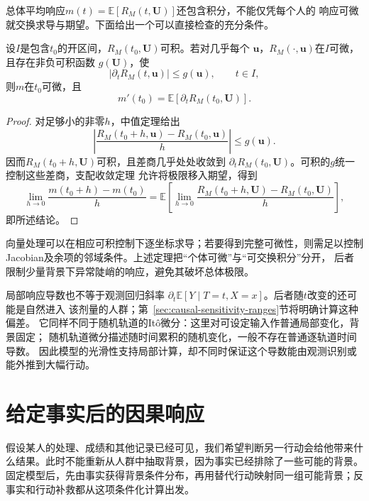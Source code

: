 总体平均响应\(m(t)=\mathbb E[R_M(t,\bm U)]\)还包含积分，不能仅凭每个人的
响应可微就交换求导与期望。下面给出一个可以直接检查的充分条件。
\begin{theorem}[平均响应的求导]
  \label{thm:causal-response-differentiation}
  设\(I\)是包含\(t_0\)的开区间，\(R_M(t_0,\bm U)\)可积。若对几乎每个
  \(\bm u\)，\(R_M(\cdot,\bm u)\)在\(I\)可微，且存在非负可积函数
  \(g(\bm U)\)，使
  \[
    |\partial_tR_M(t,\bm u)|\leq g(\bm u),
    \qquad t\in I,
  \]
  则\(m\)在\(t_0\)可微，且
  \begin{equation}
    m'(t_0)=\mathbb E[\partial_tR_M(t_0,\bm U)].
    \label{eq:causal-average-response-derivative}
  \end{equation}
\end{theorem}
\begin{proof}
  对足够小的非零\(h\)，中值定理给出
  \[
    \left|
      \frac{R_M(t_0+h,\bm u)-R_M(t_0,\bm u)}{h}
    \right|\leq g(\bm u).
  \]
  因而\(R_M(t_0+h,\bm U)\)可积，且差商几乎处处收敛到
  \(\partial_tR_M(t_0,\bm U)\)。可积的\(g\)统一控制这些差商，支配收敛定理
  允许将极限移入期望，得到
  \[
    \lim_{h\to0}\frac{m(t_0+h)-m(t_0)}{h}
    =
    \mathbb E\!\left[
      \lim_{h\to0}
      \frac{R_M(t_0+h,\bm U)-R_M(t_0,\bm U)}{h}
    \right],
  \]
  即所述结论。
\end{proof}

向量处理可以在相应可积控制下逐坐标求导；若要得到完整可微性，则需足以控制
Jacobian及余项的邻域条件。上述定理把“个体可微”与“可交换积分”分开，
后者限制少量背景下异常陡峭的响应，避免其破坏总体极限。

局部响应导数也不等于观测回归斜率
\(\partial_t\mathbb E[Y\mid T=t,X=x]\)。后者随\(t\)改变的还可能是自然进入
该剂量的人群；第~\ref{sec:causal-sensitivity-ranges}节将明确计算这种偏差。
它同样不同于随机轨道的It\^o微分：这里对可设定输入作普通局部变化，背景固定；
随机轨道微分描述随时间累积的随机变化，一般不存在普通逐轨道时间导数。
因此模型的光滑性支持局部计算，却不同时保证这个导数能由观测识别或能外推到大幅行动。

\section{给定事实后的因果响应}
\label{sec:causal-counterfactual-recourse}

假设某人的处理、成绩和其他记录已经可见，我们希望判断另一行动会给他带来什么结果。此时不能重新从人群中抽取背景，因为事实已经排除了一些可能的背景。固定模型后，先由事实获得背景条件分布，再用替代行动映射同一组可能背景；反事实和行动补救都从这项条件化计算出发。

